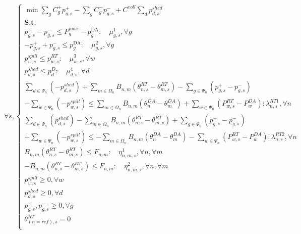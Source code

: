 \begin{equation}
    \forall s,
    \begin{cases}
\min  \sum_g  C_g^+ p_{g,s}^{+} - \sum_g  C_g^- p_{g,s}^{-} + C^{voll}\sum_d p_{d,s}^{shed} &\\
\textbf{S.t.} &\\
p_{g,s}^{+}-p_{g,s}^{-} \leq {P}_{g}^{max} - p_{g}^{\mathrm{DA}}: \quad \mu^1_{g,s} , \forall g &\\
-p_{g,s}^{+}+p_{g,s}^{-} \leq p_{g}^{\mathrm{DA}}: \quad \mu^2_{g,s} , \forall g  &\\
p_{w,s}^{spill} \leq p_{w,s}^{RT}:\quad \mu^3_{w,s}, \forall w &\\
p_{d,s}^{shed} \leq p_d^D:\quad \mu^4_{d,s},  \forall d &\\
\sum_{d \in \Psi_{n}} (- p_{d,s}^{shed})+\sum_{m \in \Omega_{n}} B_{n, m}\left(\theta_{n,s}^{RT}-\theta_{m,s}^{RT}\right)-\sum_{g \in \Psi_{n}} (p_{g,s}^{+}-p_{g,s}^{-}) \hspace{2cm} \\- \sum_{w \in \Psi_{n}} (-p_{w,s}^{spill}) \leq \sum_{m \in \Omega_{n}}B_{n, m}(\theta_{n}^{DA}-\theta_{m}^{DA}) + \sum_{w \in \Psi_{n}} (P_{w,s}^{RT}-P_w^{DA}) :\lambda_{n,s}^{RT1}, \forall n &\\
\sum_{d \in \Psi_{n}} (p_{d,s}^{shed})-\sum_{m \in \Omega_{n}} B_{n, m}\left(\theta_{n,s}^{RT}-\theta_{m,s}^{RT}\right)+\sum_{g \in \Psi_{n}} (p_{g,s}^{+}-p_{g,s}^{-}) \hspace{2cm} \\+ \sum_{w \in \Psi_{n}} (-p_{w,s}^{spill}) \leq- \sum_{m \in \Omega_{n}}B_{n, m}(\theta_{n}^{DA}-\theta_{m}^{DA}) -\sum_{w \in \Psi_{n}} (P_{w,s}^{RT}-P_w^{DA}) :\lambda_{n,s}^{RT2}, \forall n &\\
B_{n, m}\left(\theta_{n,s}^{RT}-\theta_{m,s}^{RT}\right) \leq F_{n,m}:\quad \eta^1_{n,m,s}, \forall n, \forall m &\\
-B_{n, m}\left(\theta_{n,s}^{RT}-\theta_{m,s}^{RT}\right) \leq F_{n,m}:\quad \eta^2_{n,m,s}, \forall n, \forall m &\\
p^{spill}_{w,s}\geq 0, \forall w &\\
p^{shed}_{d,s}\geq 0, \forall d &\\
p_{g,s}^+, p_{g,s}^- \geq 0, \forall g &\\
\theta^{RT}_{(n=r e f),s}=0 &\\
     \end{cases}  
\end{equation}



